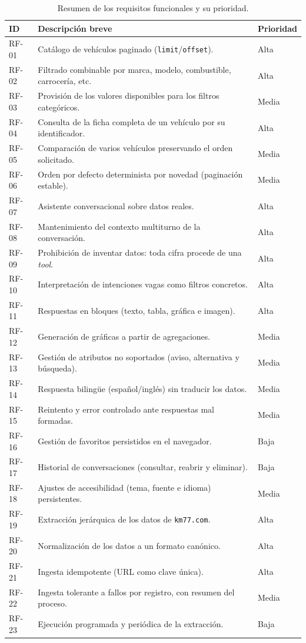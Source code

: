 \begin{table}[H]
\centering
\begin{tabular}{p{1.3cm}p{9.7cm}p{1.6cm}}
\hline
\textbf{ID} & \textbf{Descripción breve} & \textbf{Prioridad} \\
\hline
RF-01 & Catálogo de vehículos paginado (\texttt{limit}/\texttt{offset}). & Alta \\
RF-02 & Filtrado combinable por marca, modelo, combustible, carrocería, etc. & Alta \\
RF-03 & Provisión de los valores disponibles para los filtros categóricos. & Media \\
RF-04 & Consulta de la ficha completa de un vehículo por su identificador. & Alta \\
RF-05 & Comparación de varios vehículos preservando el orden solicitado. & Media \\
RF-06 & Orden por defecto determinista por novedad (paginación estable). & Media \\
RF-07 & Asistente conversacional sobre datos reales. & Alta \\
RF-08 & Mantenimiento del contexto multiturno de la conversación. & Alta \\
RF-09 & Prohibición de inventar datos: toda cifra procede de una \emph{tool}. & Alta \\
RF-10 & Interpretación de intenciones vagas como filtros concretos. & Alta \\
RF-11 & Respuestas en bloques (texto, tabla, gráfica e imagen). & Alta \\
RF-12 & Generación de gráficas a partir de agregaciones. & Media \\
RF-13 & Gestión de atributos no soportados (aviso, alternativa y búsqueda). & Media \\
RF-14 & Respuesta bilingüe (español/inglés) sin traducir los datos. & Media \\
RF-15 & Reintento y error controlado ante respuestas mal formadas. & Media \\
RF-16 & Gestión de favoritos persistidos en el navegador. & Baja \\
RF-17 & Historial de conversaciones (consultar, reabrir y eliminar). & Baja \\
RF-18 & Ajustes de accesibilidad (tema, fuente e idioma) persistentes. & Media \\
RF-19 & Extracción jerárquica de los datos de \texttt{km77.com}. & Alta \\
RF-20 & Normalización de los datos a un formato canónico. & Alta \\
RF-21 & Ingesta idempotente (URL como clave única). & Alta \\
RF-22 & Ingesta tolerante a fallos por registro, con resumen del proceso. & Media \\
RF-23 & Ejecución programada y periódica de la extracción. & Baja \\
\hline
\end{tabular}
\caption{Resumen de los requisitos funcionales y su prioridad.}
\label{tab:resumen-rf}
\end{table}

